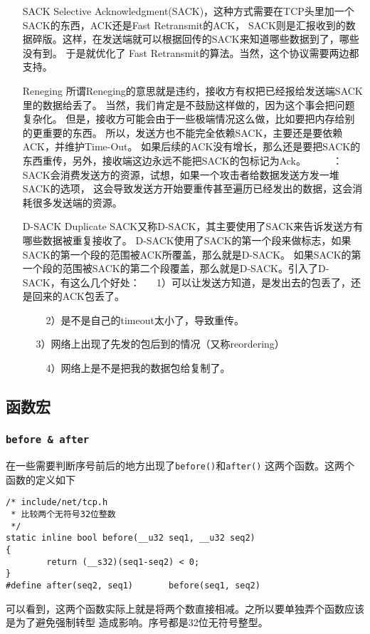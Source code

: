 \begin{enumerate}
\item[SACK]         Selective Acknowledgment(SACK)，这种方式需要在TCP头里加一个SACK的东西，ACK还是Fast Retransmit的ACK，
                    SACK则是汇报收到的数据碎版。这样，在发送端就可以根据回传的SACK来知道哪些数据到了，哪些没有到。
                    于是就优化了 Fast Retransmit的算法。当然，这个协议需要两边都支持。
\item[Reneging]     所谓Reneging的意思就是违约，接收方有权把已经报给发送端SACK里的数据给丢了。
                    当然，我们肯定是不鼓励这样做的，因为这个事会把问题复杂化。
                    但是，接收方可能会由于一些极端情况这么做，比如要把内存给别的更重要的东西。
                    所以，发送方也不能完全依赖SACK，主要还是要依赖ACK，并维护Time-Out。
                    如果后续的ACK没有增长，那么还是要把SACK的东西重传，另外，接收端这边永远不能把SACK的包标记为Ack。
　　                    \color{red}{注意}：SACK会消费发送方的资源，试想，如果一个攻击者给数据发送方发一堆SACK的选项，
                    这会导致发送方开始要重传甚至遍历已经发出的数据，这会消耗很多发送端的资源。

\item[D-SACK]       Duplicate SACK又称D-SACK，其主要使用了SACK来告诉发送方有哪些数据被重复接收了。
                    D-SACK使用了SACK的第一个段来做标志，如果SACK的第一个段的范围被ACK所覆盖，那么就是D-SACK。
                    如果SACK的第一个段的范围被SACK的第二个段覆盖，那么就是D-SACK。引入了D-SACK，有这么几个好处：
　                      1）可以让发送方知道，是发出去的包丢了，还是回来的ACK包丢了。

　　                        2）是不是自己的timeout太小了，导致重传。

　                      3）网络上出现了先发的包后到的情况（又称reordering）

　　                        4）网络上是不是把我的数据包给复制了。
\end{enumerate}
    \subsection{函数宏}
        \subsubsection{\texttt{before & after}}
            在一些需要判断序号前后的地方出现了\texttt{before()}和\texttt{after()}
            这两个函数。这两个函数的定义如下
\begin{verbatim}
/* include/net/tcp.h
 * 比较两个无符号32位整数
 */
static inline bool before(__u32 seq1, __u32 seq2)
{
        return (__s32)(seq1-seq2) < 0;
}
#define after(seq2, seq1)       before(seq1, seq2)
\end{verbatim}
        可以看到，这两个函数实际上就是将两个数直接相减。之所以要单独弄个函数应该是为了避免强制转型
        造成影响。序号都是32位无符号整型。
